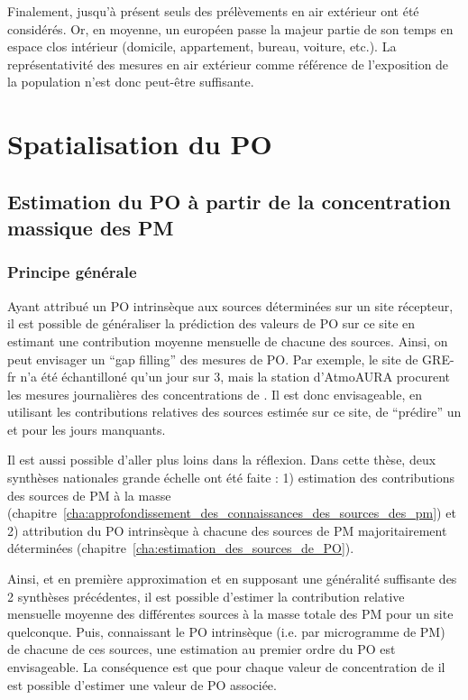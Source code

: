 Finalement, jusqu'à présent seuls des prélèvements en air extérieur ont été considérés. Or, en moyenne, un européen passe la majeur partie de son temps en espace clos intérieur (domicile,
appartement, bureau, voiture, etc.).  La représentativité des mesures en air extérieur
comme référence de l'exposition de la population n'est donc peut-être suffisante.

\section{Spatialisation du PO}

\subsection{Estimation du PO à partir de la concentration massique des PM}

\subsubsection{Principe générale}

Ayant attribué un PO intrinsèque aux sources déterminées sur un site récepteur, il est
possible de généraliser la prédiction des valeurs de PO sur ce site en estimant une
contribution moyenne mensuelle de chacune des sources. Ainsi, on peut envisager un ``gap
filling'' des mesures de PO. Par exemple, le site de GRE-fr n'a été échantilloné qu'un
jour sur 3, mais la station d'AtmoAURA procurent les mesures journalières des
concentrations de \PMdix. Il est donc envisageable, en utilisant les contributions
relatives des sources estimée sur ce site, de ``prédire'' un \POAAv{} et \PODTTv{} pour
les jours manquants.

Il est aussi possible d'aller plus loins dans la réflexion. Dans cette thèse, deux
synthèses nationales grande échelle ont été faite : 1) estimation des contributions des
sources de PM à la masse \autocite{weberComparison2019}
(chapitre~\ref{cha:approfondissement_des_connaissances_des_sources_des_pm}) et 2) attribution du PO intrinsèque à
chacune des sources de PM majoritairement déterminées \autocite{weberSourceinprep.}
(chapitre~\ref{cha:estimation_des_sources_de_PO}).

Ainsi, et en première approximation et en supposant une généralité suffisante des 2
synthèses précédentes, il est possible d'estimer la contribution relative mensuelle
moyenne des différentes sources à la masse totale des PM pour un site quelconque.  Puis,
connaissant le PO intrinsèque (i.e. par microgramme de PM) de chacune de ces sources, une
estimation au premier ordre du PO est envisageable.  La conséquence est que pour chaque
valeur de concentration de \PMdix{} il est possible d'estimer une valeur de PO associée.

